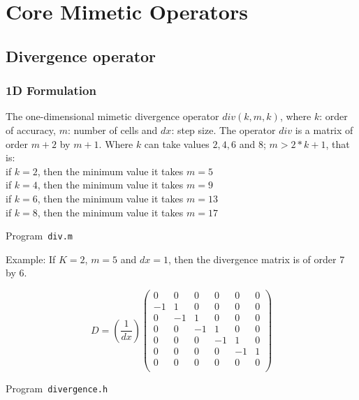 \chapter{Core Mimetic Operators}

\section{Divergence operator}

\subsection{1D Formulation}
The one-dimensional mimetic divergence operator $div(k,m,k)$, where $k$: order of accuracy, $m$: number of cells and $dx$: step size. The operator $div$ is a matrix of order $m+2$ by $m+1$. Where $k$ can take values $​​2, 4, 6$ and $8$; $m > 2*k+1$, that is:\\

if $k=2$, then the minimum value it takes $m=5$\\
if $k=4$, then the minimum value it takes $m=9$\\
if $k=6$, then the minimum value it takes $m=13$\\
if $k=8$, then the minimum value it takes $m=17$\\
\begin{listing}[ht!]
	\tiny
	\centering
	\caption{Program~\texttt{div.m}}
	\label{code:div.m}
\end{listing}


Example: If  $K=2$, $m=5$ and $dx=1$, then the divergence matrix is ​​of order 7 by 6.

\begin{equation}
D= (\frac{1}{dx})\begin{pmatrix}
0 & 0 & 0 & 0 & 0 & 0\\
-1 & 1 & 0 & 0 & 0 & 0\\
0 & -1 & 1 & 0 & 0 & 0\\
0 & 0 & -1 & 1 & 0 & 0\\
0 & 0 & 0 & -1 & 1 & 0\\
0 & 0 & 0 & 0 & -1 & 1\\
0 & 0 & 0 & 0 & 0 & 0\\
\end{pmatrix}
\end{equation}



\begin{listing}[ht!]
	\tiny
	\centering
	\caption{Program~\texttt{divergence.h}}
	\label{code:divergence.h}
\end{listing}

